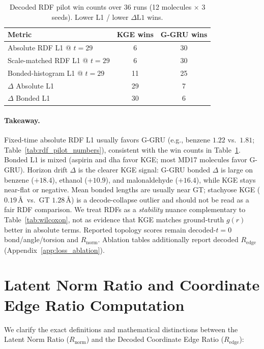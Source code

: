 \documentclass{article}
\newcommand{\GKE}{\textsc{KGE}}
\newcommand{\GGRU}{\textsc{G-GRU}}
\begin{document}
\begin{table}[H]
\centering
\caption{Decoded RDF pilot win counts over $36$ runs (12 molecules $\times$ 3 seeds). Lower L1 / lower $\Delta\mathrm{L1}$ wins.}
\label{tab:rdf_pilot_wins}
\begin{tabular}{lcc}
\toprule
\textbf{Metric} & \GKE{} wins & \GGRU{} wins \\
\midrule
Absolute RDF L1 @ $t{=}29$ & 6 & 30 \\
Scale-matched RDF L1 @ $t{=}29$ & 6 & 30 \\
Bonded-histogram L1 @ $t{=}29$ & 11 & 25 \\
$\Delta$ Absolute L1 & 29 & 7 \\
$\Delta$ Bonded L1 & 30 & 6 \\
\bottomrule
\end{tabular}
\end{table}

\paragraph{Takeaway.}
Fixed-time absolute RDF L1 usually favors \GGRU{} (e.g., benzene $1.22$ vs.\ $1.81$; Table~\ref{tab:rdf_pilot_numbers}), consistent with the win counts in Table~\ref{tab:rdf_pilot_wins}.
Bonded L1 is mixed (aspirin and dha favor \GKE{}; most MD17 molecules favor \GGRU{}).
Horizon drift $\Delta$ is the clearer \GKE{} signal: \GGRU{} bonded $\Delta$ is large on benzene ($+18.4$), ethanol ($+10.9$), and malonaldehyde ($+16.4$), while \GKE{} stays near-flat or negative.
Mean bonded lengths are usually near GT; stachyose \GKE{} ($0.19$\,\AA\ vs.\ GT $1.28$\,\AA) is a decode-collapse outlier and should not be read as a fair RDF comparison.
We treat RDFs as a \emph{stability} nuance complementary to Table~\ref{tab:wilcoxon}, not as evidence that \GKE{} matches ground-truth $g(r)$ better in absolute terms.
Reported topology scores remain decoded-$t=0$ bond/angle/torsion and $R_{\text{norm}}$. Ablation tables additionally report decoded $R_{\text{edge}}$ (Appendix~\ref{app:loss_ablation}).

\section{Latent Norm Ratio and Coordinate Edge Ratio Computation}
\label{app:norm_ratio}

We clarify the exact definitions and mathematical distinctions between the Latent Norm Ratio ($R_{\text{norm}}$) and the Decoded Coordinate Edge Ratio ($R_{\text{edge}}$):
\end{document}
